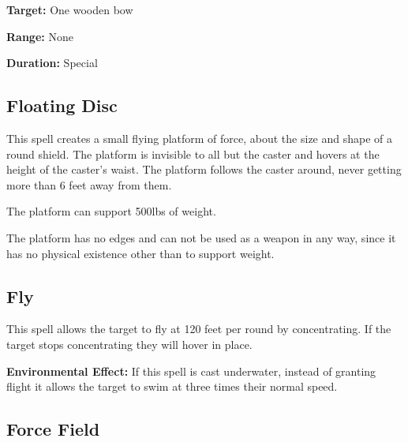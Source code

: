 \begin{multicols*}{2}
{\textbf{Target:} One wooden bow

\textbf{Range:} None

\textbf{Duration:} Special}



\subsection{Floating Disc}\label{spell:Floating Disc}

This spell creates a small flying platform of force, about the size and shape of a round shield. The platform is invisible to all but the caster and hovers at the height of the caster’s waist. The platform follows the caster around, never getting more than 6 feet away from them.

The platform can support 500lbs of weight.

The platform has no edges and can not be used as a weapon in any way, since it has no physical existence other than to support weight.

\subsection{Fly}\label{spell:Fly}

This spell allows the target to fly at 120 feet per round by concentrating. If the target stops concentrating they will hover in place.

\textbf{Environmental Effect:} If this spell is cast underwater, instead of granting flight it allows the target to swim at three times their normal speed.

\subsection{Force Field}\label{spell:Force Field}
\end{multicols*}
